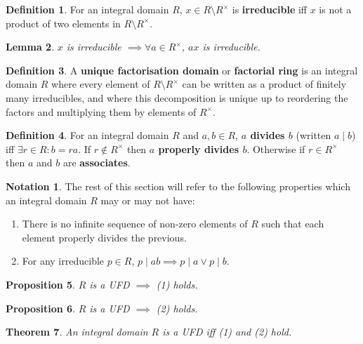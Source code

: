 \documentclass[12pt]{article}
\newtheorem{thm}{Theorem}[section]
\newtheorem{lem}[thm]{Lemma}
\newtheorem{prop}[thm]{Proposition}
\theoremstyle{definition}
\newtheorem{defn}[thm]{Definition}
\newtheorem*{not*}{Notation}
\begin{document}
\begin{defn}
  For an integral domain $R$, $x \in R \setminus R^{\times}$ is \textbf{irreducible} iff $x$ is not a product of two elements in $R \setminus R^{\times}$.
\end{defn}

\begin{lem}
  $x$ is irreducible $\implies \forall a \in R^{\times}$, $ax$ is irreducible.
\end{lem}

\begin{defn}
  A \textbf{unique factorisation domain} or \textbf{factorial ring} is an integral domain $R$ where every element of $R \setminus R^{\times}$ can be written as a product of finitely many irreducibles, and where this decomposition is unique up to reordering the factors and multiplying them by elements of $R^{\times}$.
\end{defn}

\begin{defn}
  For an integral domain $R$ and $a, b \in R$, \textbf{$a$ divides $b$} (written $a \mid b$) iff $\exists r \in R : b = ra$.
  If $r \notin R^{\times}$ then \textbf{$a$ properly divides $b$}.
  Otherwise if $r \in R^{\times}$ then $a$ and $b$ are \textbf{associates}.
\end{defn}

\begin{not*}
  The rest of this section will refer to the following properties which an integral domain $R$ may or may not have:
  \begin{enumerate}
    \item There is no infinite sequence of non-zero elements of $R$ such that each element properly divides the previous.
    \item For any irreducible $p \in R$, $p \mid ab \implies p \mid a \lor p \mid b$.
  \end{enumerate}
\end{not*}

\begin{prop}
  $R$ is a UFD $\implies$ (1) holds.
\end{prop}

\begin{prop}
  $R$ is a UFD $\implies$ (2) holds.
\end{prop}

\begin{thm}
  An integral domain $R$ is a UFD iff (1) and (2) hold.
\end{thm}
\end{document}
